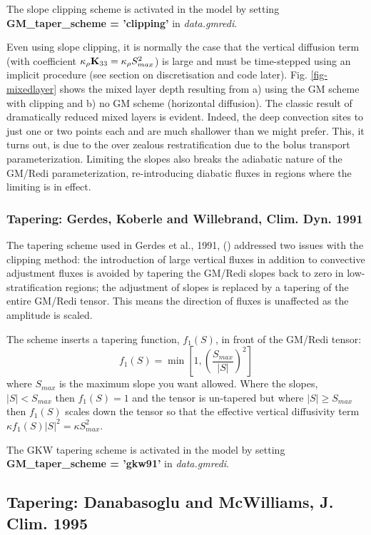 The slope clipping scheme is activated in the model by setting {\bf
GM\_tap\-er\_scheme = 'clipping'} in {\em data.gmredi}.

Even using slope clipping, it is normally the case that the vertical
diffusion term (with coefficient $\kappa_\rho{\bf K}_{33} =
\kappa_\rho S_{max}^2$) is large and must be time-stepped using an
implicit procedure (see section on discretisation and code later).
Fig. \ref{fig-mixedlayer} shows the mixed layer depth resulting from
a) using the GM scheme with clipping and b) no GM scheme (horizontal
diffusion). The classic result of dramatically reduced mixed layers is
evident. Indeed, the deep convection sites to just one or two points
each and are much shallower than we might prefer. This, it turns out,
is due to the over zealous restratification due to the bolus transport
parameterization. Limiting the slopes also breaks the adiabatic nature
of the GM/Redi parameterization, re-introducing diabatic fluxes in
regions where the limiting is in effect.

\subsubsection{Tapering: Gerdes, Koberle and Willebrand, Clim. Dyn. 1991}

The tapering scheme used in Gerdes et al., 1991, (\cite{gkw91})
addressed two issues with the clipping method: the introduction of
large vertical fluxes in addition to convective adjustment fluxes is
avoided by tapering the GM/Redi slopes back to zero in
low-stratification regions; the adjustment of slopes is replaced by a
tapering of the entire GM/Redi tensor. This means the direction of
fluxes is unaffected as the amplitude is scaled.

The scheme inserts a tapering function, $f_1(S)$, in front of the
GM/Redi tensor:
\begin{equation}
f_1(S) = \min \left[ 1, \left( \frac{S_{max}}{|S|}\right)^2 \right]
\end{equation}
where $S_{max}$ is the maximum slope you want allowed. Where the
slopes, $|S|<S_{max}$ then $f_1(S) = 1$ and the tensor is un-tapered
but where $|S| \ge S_{max}$ then $f_1(S)$ scales down the tensor so
that the effective vertical diffusivity term $\kappa f_1(S) |S|^2 =
\kappa S_{max}^2$.

The GKW tapering scheme is activated in the model by setting {\bf
GM\_tap\-er\_scheme = 'gkw91'} in {\em data.gmredi}.

\subsection{Tapering: Danabasoglu and McWilliams, J. Clim. 1995}

